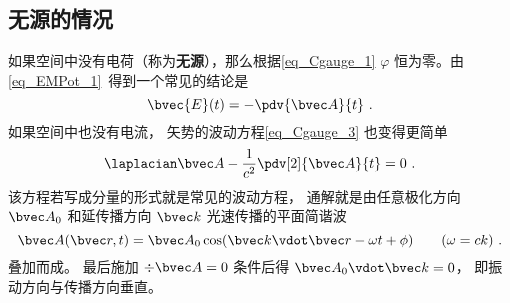 \subsection{无源的情况}
如果空间中没有电荷（称为\textbf{无源}），那么根据\autoref{eq_Cgauge_1}
\beq
$\varphi$ 恒为零。由\autoref{eq_EMPot_1}~得到一个常见的结论是
\begin{equation}\label{eq_Cgauge_2}
\bvec {E}(t) = -\pdv{\bvec A}{t}~.
\end{equation}
如果空间中也没有电流， 矢势的波动方程\autoref{eq_Cgauge_3} 也变得更简单
\begin{equation}
\laplacian \bvec A - \frac{1}{c^2} \pdv[2]{\bvec A}{t} = 0~.
\end{equation}
该方程若写成分量的形式就是常见的波动方程， 通解就是由任意极化方向 $\bvec A_0$ 和延传播方向 $\bvec k$ 光速传播的平面简谐波
\begin{equation}
\bvec A(\bvec r, t) = \bvec A_0 \cos(\bvec k \vdot \bvec r - \omega t + \phi) \qquad (\omega = ck)~.
\end{equation}
叠加而成。 最后施加 $\div \bvec A = 0$ 条件后得 $\bvec A_0 \vdot \bvec k = 0$， 即振动方向与传播方向垂直。
